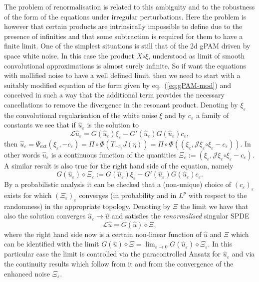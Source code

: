 \documentclass[a4paper, 11pt]{article}
\newcommand{\assign}{:=}
\newcommand{\tmtextit}[1]{{\itshape{#1}}}
\newcommand{\LL}{\mathcal{L}}
\newcommand{\reso}{\mathord{\circ}}
\begin{document}
The problem of renormalisation is related to this ambiguity and to the
robustness of the form of the equations under irregular perturbations. Here
the problem is however that certain products are intrinsically
impossible to define due to the presence of infinities and that some
subtraction is required for them to have a finite limit. One of the simplest
situations is still that of the 2d gPAM driven by space white noise. In this
case the product $X \reso \xi$, understood as limit of smooth convolutional
approximations is almost surely infinite. So if want the equations with mollified noise to have a well
defined limit, then we need to start with a suitably modified equation of the form
given by eq.~(\ref{eq:gPAM-mod}) and conceived in such a way that the
additional term provides the necessary cancellations to remove the divergence
in the resonant product. Denoting by $\xi_{\varepsilon}$ the convolutional
regularisation of the white noise $\xi$ and by $c_{\varepsilon}$ a family of
constants we see that if $\hat{u}_{\varepsilon}$ is the solution to
\[
   \LL \hat{u}_{\varepsilon} = G (\hat{u}_{\varepsilon}) \xi_{\varepsilon} - G' (\hat{u}_{\varepsilon}) G (\hat{u}_{\varepsilon}) c_{\varepsilon},
\]
then $\hat{u}_{\varepsilon} = \Psi_{\text{ext}} (\xi_{\varepsilon}, -
c_{\varepsilon}) = \Pi \circ \Phi (T_{- c_{\varepsilon}} J (\eta)) = \Pi \circ
\Phi ((\xi_{\varepsilon}, \mathcal{J}\! \xi_{\varepsilon} \reso
\xi_{\varepsilon} - c_{\varepsilon}))$. In other words $\hat{u}_{\varepsilon}$
is a continuous function of the quantities $\Xi_{\varepsilon} \assign
(\xi_{\varepsilon}, \mathcal{J}\! \xi_{\varepsilon} \reso \xi_{\varepsilon} -
c_{\varepsilon})$. A similar result is also true for the right hand side of the
equation, namely
\[ G (\hat{u}_{\varepsilon}) \diamond \Xi_{\varepsilon} \assign G
   (\hat{u}_{\varepsilon}) \xi_{\varepsilon} - G' (\hat{u}_{\varepsilon}) G
   (\hat{u}_{\varepsilon}) c_{\varepsilon} . \]
By a probabilistic analysis it can be checked that a (non-unique) choice of
$(c_{\varepsilon})_{\varepsilon}$ exists for which
$(\Xi_{\varepsilon})_{\varepsilon}$ converges (in probability and in $L^p$
with respect to the randomness) in the appropriate topology. Denoting by $\Xi$
the limit we have that also the solution converges $\hat{u}_{\varepsilon}
\rightarrow \hat{u}$ and satisfies the \tmtextit{renormalised} singular SPDE
\[ \LL \hat{u} = G (\hat{u}) \diamond \Xi, \]
where the right hand side now is a certain non-linear function of $\hat{u}$ and $\Xi$ which
can be identified with the limit $G (\hat{u}) \diamond \Xi = \lim_{\varepsilon
\rightarrow 0} G (\hat{u}_{\varepsilon}) \diamond \Xi_{\varepsilon}$. In this
particular case the limit is controlled via the paracontrolled
Ansatz for $\hat{u}_{\varepsilon}$ and via the continuity results
which follow from it and from the convergence of the enhanced noise
$\Xi_{\varepsilon}$.
\end{document}
